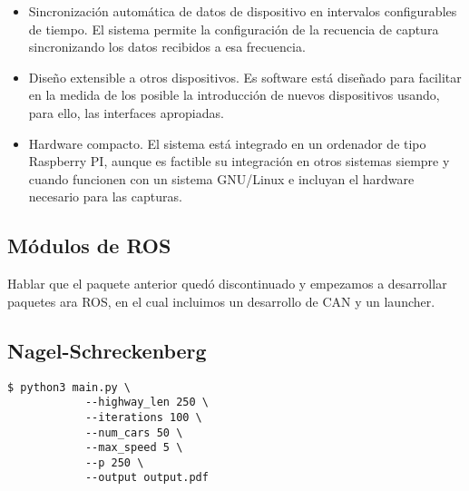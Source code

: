 \begin{itemize}
	\item Sincronización automática de datos de dispositivo en intervalos configurables de tiempo. El sistema permite la configuración de la recuencia de captura sincronizando los datos recibidos a esa frecuencia.
	\item Diseño extensible a otros dispositivos. Es software está diseñado para facilitar en la medida de los posible la introducción de nuevos dispositivos usando, para ello, las interfaces apropiadas.
	\item Hardware compacto. El sistema está integrado en un ordenador de tipo Raspberry PI, aunque es factible su integración en otros sistemas siempre y cuando funcionen con un sistema GNU/Linux e incluyan el hardware necesario para las capturas.
\end{itemize}

\subsection{Módulos de ROS}

Hablar que el paquete anterior quedó discontinuado y empezamos a desarrollar paquetes ara ROS, en el cual incluimos un desarrollo de CAN y un launcher.

\subsection{Nagel-Schreckenberg}

\begin{lstlisting}[style=bash]
$ python3 main.py \
            --highway_len 250 \
            --iterations 100 \
            --num_cars 50 \
            --max_speed 5 \
            --p 250 \
            --output output.pdf
\end{lstlisting}